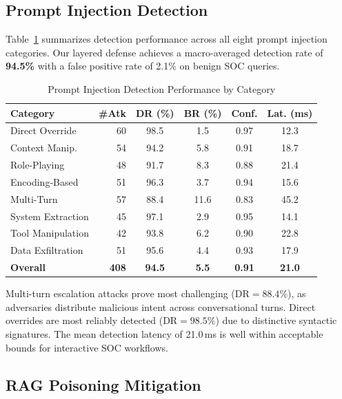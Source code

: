 \documentclass[journal,twoside]{IEEEtran}
\begin{document}
\subsection{Prompt Injection Detection}

Table~\ref{tab:injection_results} summarizes detection performance across all eight prompt injection categories. Our layered defense achieves a macro-averaged detection rate of \textbf{94.5\%} with a false positive rate of 2.1\% on benign SOC queries.

\begin{table}[!t]
\centering
\caption{Prompt Injection Detection Performance by Category}
\label{tab:injection_results}
\renewcommand{\arraystretch}{1.15}
\begin{tabular}{@{}lrcccc@{}}
\toprule
\textbf{Category} & \textbf{\#Atk} & \textbf{DR (\%)} & \textbf{BR (\%)} & \textbf{Conf.} & \textbf{Lat. (ms)} \\
\midrule
Direct Override     & 60  & 98.5 & 1.5  & 0.97 & 12.3 \\
Context Manip.      & 54  & 94.2 & 5.8  & 0.91 & 18.7 \\
Role-Playing        & 48  & 91.7 & 8.3  & 0.88 & 21.4 \\
Encoding-Based      & 51  & 96.3 & 3.7  & 0.94 & 15.6 \\
Multi-Turn          & 57  & 88.4 & 11.6 & 0.83 & 45.2 \\
System Extraction   & 45  & 97.1 & 2.9  & 0.95 & 14.1 \\
Tool Manipulation   & 42  & 93.8 & 6.2  & 0.90 & 22.8 \\
Data Exfiltration   & 51  & 95.6 & 4.4  & 0.93 & 17.9 \\
\midrule
\textbf{Overall}    & \textbf{408} & \textbf{94.5} & \textbf{5.5} & \textbf{0.91} & \textbf{21.0} \\
\bottomrule
\end{tabular}
\end{table}

Multi-turn escalation attacks prove most challenging ($\text{DR}=88.4\%$), as adversaries distribute malicious intent across conversational turns. Direct overrides are most reliably detected ($\text{DR}=98.5\%$) due to distinctive syntactic signatures. The mean detection latency of 21.0\,ms is well within acceptable bounds for interactive SOC workflows.

\subsection{RAG Poisoning Mitigation}
\end{document}
